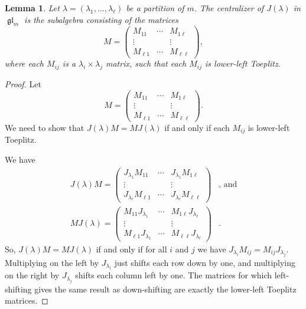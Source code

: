 \documentclass[12pt,psamsfonts]{article}
\DeclareMathOperator{\gl}{\mathfrak{gl}}
\newtheorem{lemma}[theorem]{Lemma}
\begin{document}
\begin{lemma}\label{nilpotent_centralizer}
    Let \(\lambda = (\lambda_1, ..., \lambda_\ell)\) be a partition of \(m\).
    The centralizer of \(J(\lambda)\) in \(\gl_m\) is the subalgebra consisting of the matrices 
    \[M = \begin{pmatrix}
        M_{11} & \cdots & M_{1\ell}\\
        \vdots &        & \vdots\\
        M_{\ell 1} & \cdots & M_{\ell\ell}
    \end{pmatrix},\]
    where each \(M_{ij}\) is a \(\lambda_i \times \lambda_j\) matrix, such that each \(M_{ij}\) is lower-left Toeplitz.
\end{lemma}
\begin{proof}
    Let 
    \[M = \begin{pmatrix}
        M_{11} & \cdots & M_{1\ell}\\
        \vdots &        & \vdots\\
        M_{\ell 1} & \cdots & M_{\ell\ell}
    \end{pmatrix}.\]
    We need to show that \(J(\lambda)M = MJ(\lambda)\) if and only if each \(M_{ij}\) is lower-left Toeplitz.
    \par We have 
    \begin{align*}
        J(\lambda)M = \begin{pmatrix}
            J_{\lambda_1}M_{11} & \cdots & J_{\lambda_1}M_{1\ell}\\
            \vdots & & \vdots\\
            J_{\lambda_\ell}M_{\ell 1} & \cdots & J_{\lambda_\ell}M_{\ell\ell}
        \end{pmatrix} & , \textrm{ and} \\
        MJ(\lambda) = \begin{pmatrix}
            M_{11} J_{\lambda_1} & \cdots & M_{1\ell} J_{\lambda_\ell}\\
            \vdots & & \vdots\\
            M_{\ell 1} J_{\lambda_1} & \cdots & M_{\ell\ell} J_{\lambda_\ell}
        \end{pmatrix} & .
    \end{align*}
    So, \(J(\lambda)M = MJ(\lambda)\) if and only if for all \(i\) and \(j\) we have \(J_{\lambda_i} M_{ij} = M_{ij} J_{\lambda_j}\).
    Multiplying on the left by \(J_{\lambda_i}\) just shifts each row down by one, and multiplying on the right by \(J_{\lambda_j}\) shifts each column left by one.
    The matrices for which left-shifting gives the same result as down-shifting are exactly the lower-left Toeplitz matrices.
\end{proof}
\end{document}
